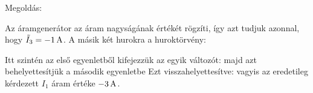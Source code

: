 
\ifdefined\megoldas
 
 Megoldás: 

 Az áramgenerátor az áram nagyságának értékét rögzíti, így azt tudjuk azonnal, hogy $\tilde I_3=-1\mathrm{\, A}$. A másik két hurokra a huroktörvény:

 Itt szintén az első egyenletből kifejezzük az egyik változót:
 majd azt behelyettesítjük a második egyenletbe
 Ezt visszahelyettesítve:
 vagyis az eredetileg kérdezett $I_1$ áram értéke $-3\mathrm{\, A}$.

\fi